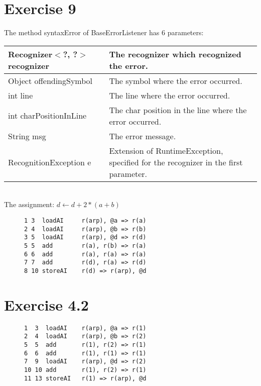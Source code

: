 \documentclass[11pt]{article} %
\begin{document}
\section*{Exercise 9}
The method syntaxError of BaseErrorListener has 6 parameters:\\

\begin{tabular}{|l|p{10cm}|}\hline
Recognizer$<$?, ?$>$ recognizer
& The recognizer which recognized the error. \\\hline

Object offendingSymbol
& The symbol where the error occurred. \\\hline

int line
& The line where the error occurred. \\\hline

int charPositionInLine
& The char position in the line where the error occurred. \\\hline

String msg
& The error message. \\\hline

RecognitionException e
& Extension of RuntimeException, specified for the recognizer in the first parameter. \\\hline
\end{tabular} \\

The assignment: $d \leftarrow d + 2 * (a + b)$
\begin{figure}[H]
\begin{verbatim}
1 3  loadAI     r(arp), @a => r(a)
2 4  loadAI     r(arp), @b => r(b)
3 5  loadAI     r(arp), @d => r(d)
5 5  add        r(a), r(b) => r(a)
6 6  add        r(a), r(a) => r(a)
7 7  add        r(d), r(a) => r(d)
8 10 storeAI    r(d) => r(arp), @d 
\end{verbatim}
\end{figure}

\section*{Exercise 4.2}
\begin{figure}[H]
\begin{verbatim}
1  3  loadAI    r(arp), @a => r(1)
2  4  loadAI    r(arp), @b => r(2)
5  5  add       r(1), r(2) => r(1)
6  6  add       r(1), r(1) => r(1)
7  9  loadAI    r(arp), @d => r(2)
10 10 add       r(1), r(2) => r(1)
11 13 storeAI   r(1) => r(arp), @d 
\end{verbatim}
\end{figure}
\end{document}
